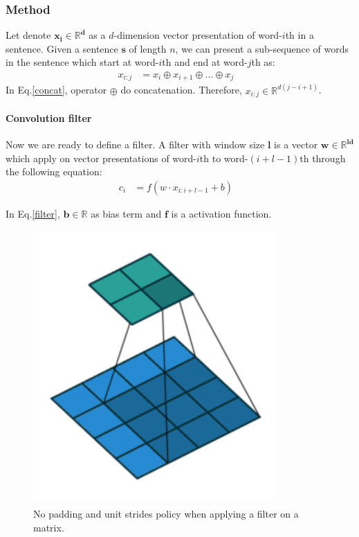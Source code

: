 \subsubsection{Method}
Let denote \(\bm{x_i \in \mathbb{R}^d}\) as a \(d\)-dimension vector presentation of word-\(i\)th in a sentence. 
Given a sentence \(\bm{s}\) of length \(n\), we can present a sub-sequence of words in the sentence which start at word-\(i\)th and end at word-\(j\)th as:
\begin{align}
    x_{i:j} &= x_i \oplus x_{i+1} \oplus ... \oplus x_{j} &\label{concat}
\end{align}
In Eq.\eqref{concat}, operator \(\bm{\oplus}\) do concatenation. Therefore, \(x_{i:j} \in \mathbb{R}^{d(j-i+1)}\). 

\paragraph{Convolution filter} \label{conv-filter} Now we are ready to define a filter. A filter with window size \(\bm{l}\) is a vector \(\bm{w \in \mathbb{R}^{ld}}\) which apply on vector presentations of word-\(i\)th to word-\((i+l-1)\)th through the following equation:
\begin{align}
    c_i &= f(w \cdot x_{i:i+l-1} + b) &\label{filter}
\end{align}

In Eq.\eqref{filter}, \(\bm{b \in \mathbb{R}}\) as bias term and \(\bm{f}\) is a activation function. 

\begin{figure}[H]
    \centering
    \includegraphics[scale=0.4]{figure/no_padding}
    \caption{No padding and unit strides policy when applying a filter on a matrix.}
    \label{fig:no_padding}
\end{figure}

